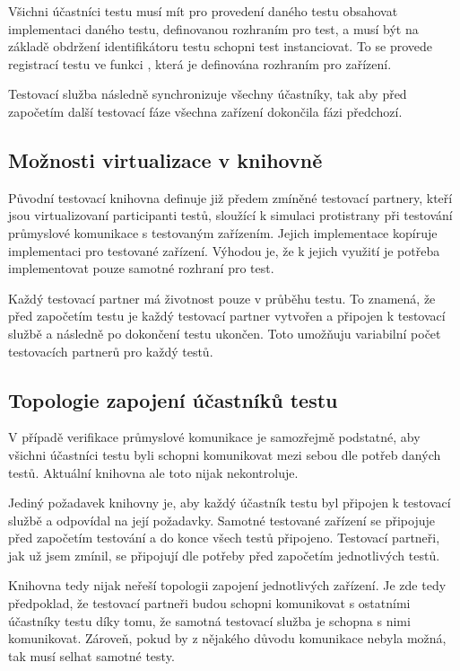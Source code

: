 Všichni účastníci testu musí mít pro provedení daného testu obsahovat implementaci daného testu, definovanou rozhraním pro test, a musí být na základě obdržení identifikátoru testu schopni test instanciovat. To se provede registrací testu ve funkci , která je definována rozhraním pro zařízení.

Testovací služba následně synchronizuje všechny účastníky, tak aby před započetím další testovací fáze všechna zařízení dokončila fázi předchozí. 

\subsection{Možnosti virtualizace v knihovně}

Původní testovací knihovna definuje již předem zmíněné testovací partnery, kteří jsou virtualizovaní participanti testů, sloužící k simulaci protistrany při testování průmyslové komunikace s testovaným zařízením. Jejich implementace kopíruje implementaci pro testované zařízení. Výhodou je, že k jejich využití je potřeba implementovat pouze samotné rozhraní pro test.

Každý testovací partner má životnost pouze v průběhu testu. To znamená, že před započetím testu je každý testovací partner vytvořen a připojen k testovací službě a následně po dokončení testu ukončen. Toto umožňuju variabilní počet testovacích partnerů pro každý testů.

\subsection{Topologie zapojení účastníků testu}

V případě verifikace průmyslové komunikace je samozřejmě podstatné, aby všichni účastníci testu byli schopni komunikovat mezi sebou dle potřeb daných testů. Aktuální knihovna ale toto nijak nekontroluje. 

Jediný požadavek knihovny je, aby každý účastník testu byl připojen k testovací službě a odpovídal na její požadavky. Samotné testované zařízení se připojuje před započetím testování a do konce všech testů připojeno. Testovací partneři, jak už jsem zmínil, se připojují dle potřeby před započetím jednotlivých testů.

Knihovna tedy nijak neřeší topologii zapojení jednotlivých zařízení. Je zde tedy předpoklad, že testovací partneři budou schopni komunikovat s ostatními účastníky testu díky tomu, že samotná testovací služba je schopna s nimi komunikovat. Zároveň, pokud by z nějakého důvodu komunikace nebyla možná, tak musí selhat samotné testy.

